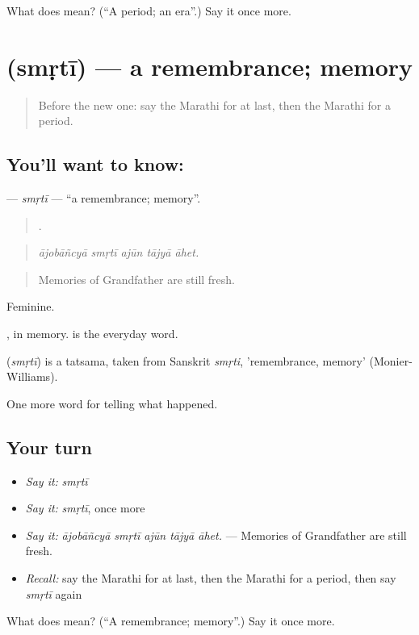 \begin{tcolorbox}[breakable,colback=teal!4,colframe=teal!35!black,title={Before you move on}]
What does  mean? (\textquotedblleft{}A period; an era\textquotedblright{}.) Say it once more.
\end{tcolorbox}
\section[\texorpdfstring{\mr{स्मृती} (smṛtī)}{स्मृती (smṛtī)}]{ (smṛtī) — a remembrance; memory}

\label{lesson:MR-C307-smrti}



\begin{quote}
Before the new one: say the Marathi for at last, then the Marathi for a period.
\end{quote}

\subsection*{You'll want to know: }
\textbf{} — \emph{smṛtī} — \textquotedblleft{}a remembrance; memory\textquotedblright{}.

\begin{quote}
    .
\end{quote}

\begin{quote}
\emph{ājobāñcyā smṛtī ajūn tājyā āhet.}
\end{quote}

\begin{quote}
Memories of Grandfather are still fresh.
\end{quote}

Feminine.

, in memory.  is the everyday word.

\begin{cousinweb}
\textbf{} (\emph{smṛtī}) is a tatsama, taken from Sanskrit \emph{smṛti}, 'remembrance, memory' (Monier-Williams).
\end{cousinweb}

\begin{grammarlens}[title={What you've built}]
One more word for telling what happened.
\end{grammarlens}

\subsection*{Your turn}
\begin{itemize}
\raggedright
  \item \emph{Say it:} \emph{smṛtī}
  \item \emph{Say it:} \emph{smṛtī}, once more
  \item \emph{Say it:} \emph{ājobāñcyā smṛtī ajūn tājyā āhet.} — Memories of Grandfather are still fresh.
  \item \emph{Recall:} say the Marathi for at last, then the Marathi for a period, then say \emph{smṛtī} again
\end{itemize}

\begin{tcolorbox}[breakable,colback=teal!4,colframe=teal!35!black,title={Before you move on}]
What does  mean? (\textquotedblleft{}A remembrance; memory\textquotedblright{}.) Say it once more.
\end{tcolorbox}
